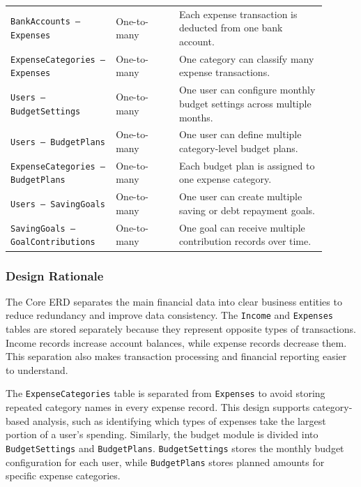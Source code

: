 ﻿\documentclass{article}
\begin{document}
\begin{longtable}{
    >{\raggedright\arraybackslash}p{0.30\linewidth}
    >{\centering\arraybackslash}p{0.18\linewidth}
    J{0.42\linewidth}
}
\texttt{BankAccounts -- Expenses}
    & One-to-many
    & Each expense transaction is deducted from one bank account. \\

\texttt{ExpenseCategories -- Expenses}
    & One-to-many
    & One category can classify many expense transactions. \\

\texttt{Users -- BudgetSettings}
    & One-to-many
    & One user can configure monthly budget settings across multiple months. \\

\texttt{Users -- BudgetPlans}
    & One-to-many
    & One user can define multiple category-level budget plans. \\

\texttt{ExpenseCategories -- BudgetPlans}
    & One-to-many
    & Each budget plan is assigned to one expense category. \\

\texttt{Users -- SavingGoals}
    & One-to-many
    & One user can create multiple saving or debt repayment goals. \\

\texttt{SavingGoals -- GoalContributions}
    & One-to-many
    & One goal can receive multiple contribution records over time. \\

\end{longtable}
\normalsize

\subsubsection{Design Rationale}

The Core ERD separates the main financial data into clear business entities to reduce redundancy
and improve data consistency. The \texttt{Income} and \texttt{Expenses} tables are stored separately
because they represent opposite types of transactions. Income records increase account balances,
while expense records decrease them. This separation also makes transaction processing and
financial reporting easier to understand.

The \texttt{ExpenseCategories} table is separated from \texttt{Expenses} to avoid storing repeated
category names in every expense record. This design supports category-based analysis, such as
identifying which types of expenses take the largest portion of a user's spending. Similarly,
the budget module is divided into \texttt{BudgetSettings} and \texttt{BudgetPlans}.
\texttt{BudgetSettings} stores the monthly budget configuration for each user, while
\texttt{BudgetPlans} stores planned amounts for specific expense categories.
\end{document}
